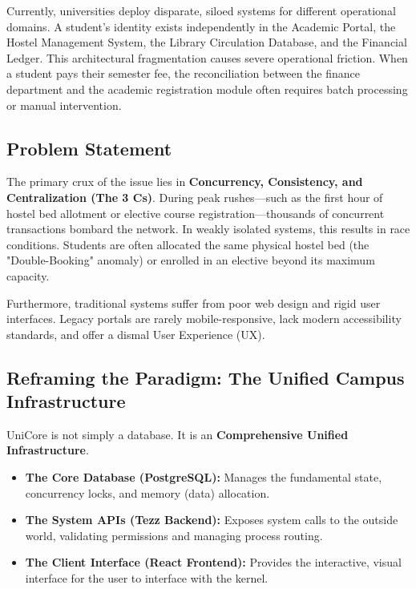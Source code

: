 \documentclass[11pt,a4paper]{article}
\begin{document}
Currently, universities deploy disparate, siloed systems for different operational domains. A student's identity exists independently in the Academic Portal, the Hostel Management System, the Library Circulation Database, and the Financial Ledger. This architectural fragmentation causes severe operational friction. When a student pays their semester fee, the reconciliation between the finance department and the academic registration module often requires batch processing or manual intervention. 

\subsection{Problem Statement}
The primary crux of the issue lies in \textbf{Concurrency, Consistency, and Centralization (The 3 Cs)}. During peak rushes—such as the first hour of hostel bed allotment or elective course registration—thousands of concurrent transactions bombard the network. In weakly isolated systems, this results in race conditions. Students are often allocated the same physical hostel bed (the "Double-Booking" anomaly) or enrolled in an elective beyond its maximum capacity.

Furthermore, traditional systems suffer from poor web design and rigid user interfaces. Legacy portals are rarely mobile-responsive, lack modern accessibility standards, and offer a dismal User Experience (UX).

\subsection{Reframing the Paradigm: The Unified Campus Infrastructure}
UniCore is not simply a database. It is an \textbf{Comprehensive Unified Infrastructure}. 
\begin{itemize}
    \item \textbf{The Core Database (PostgreSQL):} Manages the fundamental state, concurrency locks, and memory (data) allocation.
    \item \textbf{The System APIs (Tezz Backend):} Exposes system calls to the outside world, validating permissions and managing process routing.
    \item \textbf{The Client Interface (React Frontend):} Provides the interactive, visual interface for the user to interface with the kernel.
\end{itemize}

\vspace{0.5cm}
\noindent{}
\vspace{0.5cm}
\end{document}
